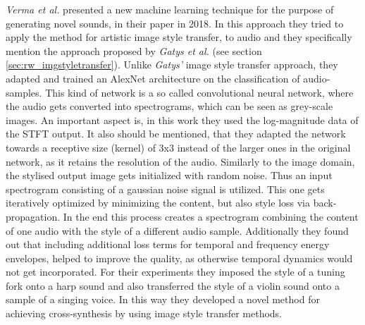\textit{Verma et al.} presented a new machine learning technique for the purpose of generating novel sounds, in their paper in 2018. \cite{verma2018neural} In this approach they tried to apply the method for artistic image style transfer, to audio and they specifically mention the approach proposed by \textit{Gatys et al.}\cite{Gatys2016} (see section \ref{sec:rw_imgstyletransfer}). Unlike \textit{Gatys'} image style transfer approach, they adapted and trained an AlexNet architecture on the classification of audio-samples. This kind of network is a so called convolutional neural network, where the audio gets converted into spectrograms, which can be seen as grey-scale images. An important aspect is, in this work they used the log-magnitude data of the STFT output. It also should be mentioned, that they adapted the network towards a receptive size (kernel) of 3x3 instead of the larger ones in the original network, as it retains the resolution of the audio. Similarly to the image domain, the stylised output image gets initialized with random noise. Thus an input spectrogram consisting of a gaussian noise signal is utilized. This one gets iteratively optimized by minimizing the content, but also style loss via back-propagation. In the end this process creates a spectrogram combining the content of one audio with the style of a different audio sample. Additionally they found out that including additional loss terms for temporal and frequency energy envelopes, helped to improve the quality, as otherwise temporal dynamics would not get incorporated. For their experiments they imposed the style of a tuning fork onto a harp sound and also transferred the style of a violin sound onto a sample of a singing voice. In this way they developed a novel method for achieving cross-synthesis by using image style transfer methods.\\

